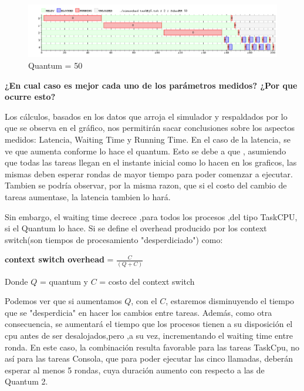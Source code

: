 \documentclass[10pt, a4paper]{article}
\begin{document}
\begin{figure}[H]
  	\centering
   	\includegraphics[width=1\textwidth]
   	 {imgs/quantum50.png}
	\caption{Quantum = 50}
\end{figure}
	

\begin{flushleft}
\textbf{¿En cual caso es mejor cada uno de los parámetros medidos? ¿Por que ocurre esto?}\\

\end{flushleft}


Los cálculos, basados en los datos que arroja el simulador y respaldados por lo que se observa en el gráfico, nos permitirán sacar conclusiones sobre los aspectos medidos: Latencia, Waiting Time y Running Time.
En el caso de la latencia, se ve que aumenta conforme lo hace el quantum. Esto se debe a que , asumiendo que todas las tareas llegan en el instante inicial como lo hacen en los graficos, las mismas deben esperar rondas de mayor tiempo para poder comenzar a ejecutar. Tambien se podría observar, por la misma razon, que si el costo del cambio de tareas aumentase, la latencia tambien lo hará.

Sin embargo, el waiting time decrece ,para todos los procesos ,del tipo TaskCPU, si el Quantum lo hace.
Si se define el overhead producido por los context switch(son tiempos de procesamiento "desperdiciado") como: \\

\begin{center}
\textbf{context switch overhead} = $\frac{C}{(Q+C)}$
\end{center}

Donde $Q$ = quantum y $C$ = costo del context switch

Podemos ver que si  aumentamos $Q$, con el $C$, estaremos disminuyendo el tiempo que se "desperdicia" en hacer los cambios entre tareas.
Además, como otra consecuencia, se aumentará el tiempo que los procesos tienen a su disposición el cpu antes de ser desalojados,pero ,a su vez, incrementando el waiting time entre ronda. En este caso, la combinación  resulta favorable para las tareas TaskCpu, no así para las tareas Consola, que para poder ejecutar las cinco llamadas, deberán esperar al menos 5 rondas, cuya duración aumento con respecto a las de Quantum 2.
\end{document}

